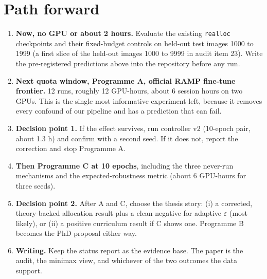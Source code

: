 \documentclass[11pt]{article}
\begin{document}
\section{Path forward}
\begin{enumerate}
\item \textbf{Now, no GPU or about 2 hours.} Evaluate the existing \texttt{realloc} checkpoints and their fixed-budget controls on held-out test images 1000 to 1999 (a first slice of the held-out images 1000 to 9999 in audit item 23). Write the pre-registered predictions above into the repository before any run.
\item \textbf{Next quota window, Programme A, official RAMP fine-tune frontier.} 12 runs, roughly 12 GPU-hours, about 6 session hours on two GPUs. This is the single most informative experiment left, because it removes every confound of our pipeline and has a prediction that can fail.
\item \textbf{Decision point 1.} If the effect survives, run controller v2 (10-epoch pair, about 1.3 h) and confirm with a second seed. If it does not, report the correction and stop Programme A.
\item \textbf{Then Programme C at 10 epochs}, including the three never-run mechanisms and the expected-robustness metric (about 6 GPU-hours for three seeds).
\item \textbf{Decision point 2.} After A and C, choose the thesis story: (i) a corrected, theory-backed allocation result plus a clean negative for adaptive $\varepsilon$ (most likely), or (ii) a positive curriculum result if C shows one. Programme B becomes the PhD proposal either way.
\item \textbf{Writing.} Keep the status report as the evidence base. The paper is the audit, the minimax view, and whichever of the two outcomes the data support.
\end{enumerate}
\end{document}
